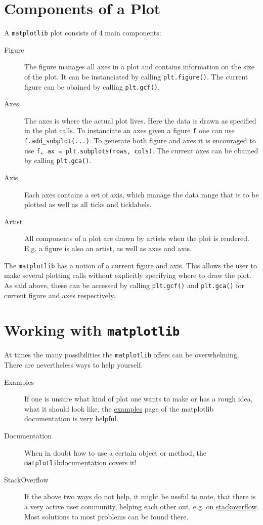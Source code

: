 \documentclass[a4paper, 11pt, twocolumn]{article}
\newcommand{\mpl}{\texttt{matplotlib}\xspace}
\newcommand{\pl}[1]{\mbox{\texttt{#1}\xspace}}
\begin{document}
\section{Components of a Plot}

A \mpl plot consists of 4 main components:
\begin{description}
\item[Figure]
The figure manages all axes in a plot and contains information on the size of
the plot. It can be instanciated by calling \pl{plt.figure()}. 
The current figure can be obained by calling \pl{plt.gcf()}.

\item[Axes]
The axes is where the actual plot lives. Here the data is drawn
as specified in the plot calls. To instanciate an axes given a figure \pl{f}
one can use \pl{f.add\_subplot(...)}. To generate both figure and axes it
is encouraged to use \pl{f, ax = plt.subplots(rows, cols)}.
The current axes can be obained by calling \pl{plt.gca()}.

\item[Axis]
Each axes contains a set of axis, which manage the data range that is to be
plotted as well as all ticks and ticklabels.

\item[Artist]
All components of a plot are drawn by artists when the plot is rendered.
E.g. a figure is also an artist, as well as axes and axis.
\end{description}

The \mpl has a notion of a current figure and axis. This allows
the user to make several plotting calls without explicitly specifying where
to draw the plot. As said above, these can be accessed by calling 
\pl{plt.gcf()} and \pl{plt.gca()} for current figure and axes respectively.


\section{Working with \mpl}

At times the many possibilities the \mpl offers can be overwhelming. There are 
nevertheless ways to help yourself.

\begin{description}
\item[Examples]
If one is unsure what kind of plot one wants to make or has a rough idea, what
it should look like, the \href{https://matplotlib.org/examples/}{examples} page
of the matplotlib documentation is very helpful.
\item[Documentation]
When in doubt how to use a certain object or method, the
\mpl \href{https://matplotlib.org/contents.html}{documentation} covers it! 
\item[StackOverflow]
If the above two ways do not help, it might be useful to note, that there is a
very active user community, helping each other out, e.g. on
\href{https://stackoverflow.com/questions/tagged/matplotlib}{stackoverflow}.
Most solutions to most problems can be found there.
\end{description}
\end{document}
